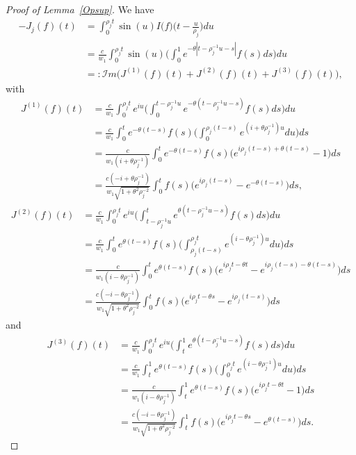\documentclass[aos]{imsart}
\theoremstyle{plain}
\theoremstyle{remark}
\newcommand{\1}{1}
\begin{document}
\begin{proof}[Proof of Lemma~\ref{Opsup}]
 We have
\begin{align*}
-J_j(f)(t)&=\int_0^{\rho_j t}\sin(u)I\big(f\big)\Big(t-\frac{u}{\rho_j}\Big)du\\
&=\frac{c}{w_1}\int_0^{\rho_j t}\sin(u)\Big(\int_0^1e^{-\theta\left|t-\rho_j^{-1}u-s\right|}f(s)ds\Big)du\\
&=:{\mathcal I}m\Bigg(J^{(1)}(f)(t)+J^{(2)}(f)(t)+J^{(3)}(f)(t)\Bigg),
\end{align*}
with
\begin{align*}
J^{(1)}(f)(t)&=\frac{c}{w_1}\int_0^{\rho_j t}e^{iu}\Big(\int_0^{t-\rho_j^{-1}u}e^{-\theta\left(t-\rho_j^{-1}u-s\right)}f(s)ds\Big)du\\
&=\frac{c}{w_1}\int_0^te^{-\theta(t-s)}f(s)\Big(\int_0^{\rho_j (t-s)}e^{(i+\theta\rho_j^{-1})u}du\Big)ds\\
&=\frac{c}{w_1(i+\theta\rho_j^{-1})}\int_0^te^{-\theta(t-s)}f(s)\Big(e^{i\rho_j (t-s)+\theta(t-s)}-1\Big)ds\\
&=\frac{c(-i+\theta\rho_j^{-1})}{w_1\sqrt{1+\theta^2\rho_j^{-2}}}\int_0^tf(s)\Big(e^{i\rho_j (t-s)}-e^{-\theta(t-s)}\Big)ds,
\end{align*}
\begin{align*}
J^{(2)}(f)(t)&=\frac{c}{w_1}\int_0^{\rho_j t}e^{iu}\Big(\int_{t-\rho_j^{-1}u}^te^{\theta\left(t-\rho_j^{-1}u-s\right)}f(s)ds\Big)du\\
&=\frac{c}{w_1}\int_0^te^{\theta(t-s)}f(s)\Big(\int_{\rho_j (t-s)}^{\rho_j t}e^{(i-\theta\rho_j^{-1})u}du\Big)ds\\
&=\frac{c}{w_1(i-\theta\rho_j^{-1})}\int_0^te^{\theta(t-s)}f(s)\Big(e^{i\rho_jt-\theta t}-e^{i\rho_j(t-s)-\theta (t-s)}\Big)ds\\
&=\frac{c(-i-\theta\rho_j^{-1})}{w_1\sqrt{1+\theta^2\rho_j^{-2}}}\int_0^tf(s)\Big(e^{i\rho_jt-\theta s}-e^{i\rho_j(t-s)}\Big)ds
\end{align*}
and
\begin{align*}
J^{(3)}(f)(t)&=\frac{c}{w_1}\int_0^{\rho_j t}e^{iu}\Big(\int_t^1e^{\theta\left(t-\rho_j^{-1}u-s\right)}f(s)ds\Big)du\\
&=\frac{c}{w_1}\int_t^1e^{\theta(t-s)}f(s)\Big(\int_{0}^{\rho_j t}e^{(i-\theta\rho_j^{-1})u}du\Big)ds\\
&=\frac{c}{w_1(i-\theta\rho_j^{-1})}\int_t^1e^{\theta(t-s)}f(s)\Big(e^{i\rho_jt-\theta t}-1\Big)ds\\
&=\frac{c(-i-\theta\rho_j^{-1})}{w_1\sqrt{1+\theta^2\rho_j^{-2}}}\int_t^1f(s)\Big(e^{i\rho_jt-\theta s}-e^{\theta(t-s)}\Big)ds.

\end{align*}
\end{proof}
\end{document}
